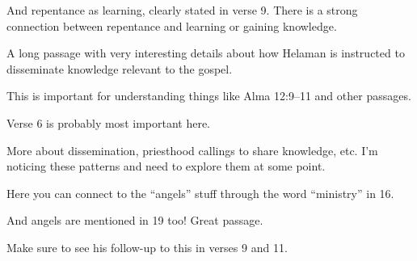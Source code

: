 \begin{compactdesc}
\begin{compactitem}
					\item And repentance as learning, clearly stated in verse 9. There is a strong connection between repentance and learning or gaining knowledge.
				\end{compactitem}
			\item[{\hyperref[ALMA-37-13]{Alma 37:13--37}}] \phantom{.}
				\begin{compactitem}
					\item A long passage with very interesting details about how Helaman is instructed to disseminate knowledge relevant to the gospel.
					\item This is important for understanding things like Alma 12:9--11 and other passages.
				\end{compactitem}
			\item[{\hyperref[ALMA-37-38]{Alma 37:38--47}}]
			\item[{\hyperref[ALMA-38-6]{Alma 38:6--10}}] \phantom{.}
				\begin{compactitem}
					\item Verse 6 is probably most important here.
				\end{compactitem}
			\item[{\hyperref[ALMA-39-5]{Alma 39:5--6}}]
			\item[{\hyperref[ALMA-39-15]{Alma 39:15--19}}] \phantom{.}
				\begin{compactitem}
					\item More about dissemination, priesthood callings to share knowledge, etc. I'm noticing these patterns and need to explore them at some point.
					\item Here you can connect to the ``angels'' stuff through the word ``ministry'' in 16.
					\item And angels are mentioned in 19 too! Great passage.
				\end{compactitem}
			\item[{\hyperref[ALMA-40-3]{Alma 40:3}}] \phantom{.}
				\begin{compactitem}
					\item Make sure to see his follow-up to this in verses 9 and 11.
				\end{compactitem}
			\item[{\hyperref[ALMA-40-13]{Alma 40:13}}]
			\item[{\hyperref[ALMA-43-2]{Alma 43:2}}]
			\item[{\hyperref[ALMA-43-23]{Alma 43:23--24}}]
			\item[{\hyperref[ALMA-45-9]{Alma 45:9--15}}] \phantom{.}

\end{compactdesc}
